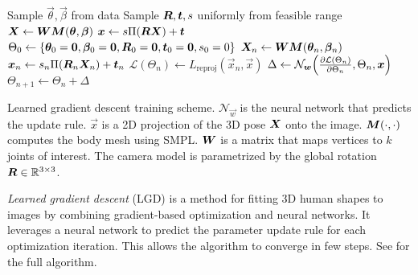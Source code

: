 \begin{algorithm}[t]
    \begin{algorithmic}[1]
        \State Sample $\vec{\theta}, \vec{\beta}$ from data
        \State Sample $\bm{R}, \bm{t}, s$ uniformly from feasible range
        \State $\bm{X} \gets \bm{W} \bm{M}(\bm{\theta}, \bm{\beta})$
        \State $\bm{x} \gets s \Pi(\bm{R} \bm{X}) + \bm{t}$
        \State $\Theta_0 \gets \{ \bm{\theta}_0 = \bm{0}, \bm{\beta}_0 = \bm{0}, \bm{R}_0 = \bm{0}, \bm{t}_0 = \bm{0}, s_0 = 0 \}$
        \State $\bm{X}_n \gets \bm{W} \bm{M}(\bm{\theta}_n, \bm{\beta}_n)$
        \State $\bm{x}_n \gets s_n \Pi(\bm{R}_n \bm{X}_n) + \bm{t}_n$
        \State $\mathcal{L}(\Theta_n) \gets L_{\mathrm{reproj}}(\vec{x}_n, \vec{x})$
        \State $\Delta \gets \mathcal{N}_{\vec{w}} \lft( \pdv{\mathcal{L}(\Theta_n)}{\Theta_n}, \Theta_n, \vec{x} \rgt)$
        \State $\Theta_{n+1} \gets \Theta_n + \Delta$
        \EndFor
    \end{algorithmic}
    \caption{Learned gradient descent training scheme. $\mathcal{N}_{\vec{w}}$ is the neural network that predicts the update rule. $\vec{x}$ is a 2D projection of the 3D pose $\bm{X}$ onto the image. $\bm{M}(\cdot, \cdot)$ computes the body mesh using SMPL. $\bm{W}$ is a matrix that maps vertices to $k$ joints of interest. The camera model is parametrized by the global rotation $\bm{R} \in \mathbb{R}^{3\times 3}$.}
    \label{alg:lgd}
\end{algorithm}

\textit{Learned gradient descent} (LGD) \citep{song2020human} is a method for fitting 3D human shapes
to images by combining gradient-based optimization and neural networks. It leverages a neural network
to predict the parameter update rule for each optimization iteration. This allows the algorithm to
converge in few steps. See  for the full algorithm.
